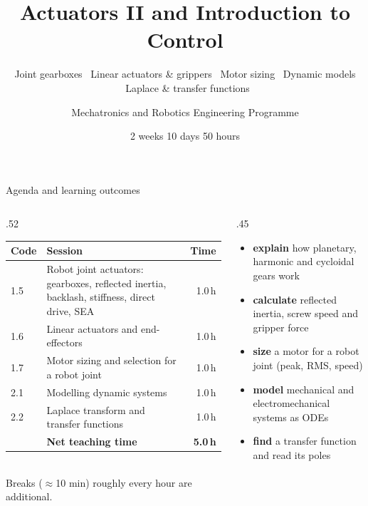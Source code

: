 \documentclass[aspectratio=169,10pt]{beamer}
\title[Actuators II and Introduction to Control]{Actuators II and Introduction to Control}
\subtitle{Joint gearboxes \textbullet\ Linear actuators \& grippers \textbullet\ Motor sizing \textbullet\ Dynamic models \textbullet\ Laplace \& transfer functions}
\author{Mechatronics and Robotics Engineering Programme}
\institute{Week 1 \textperiodcentered{} Day 2}
\date{2 weeks \textperiodcentered{} 10 days \textperiodcentered{} 50 hours}
\begin{document}
\begin{frame}[plain]\titlepage\end{frame}

\begin{frame}{Agenda and learning outcomes}
\begin{columns}[T]
\begin{column}{.52\textwidth}
\small
\renewcommand{\arraystretch}{1.12}
\begin{tabular}{@{}l p{5.0cm} r@{}}
\toprule
\textbf{Code} & \textbf{Session} & \textbf{Time}\\
\midrule
1.5 & Robot joint actuators: gearboxes, reflected inertia, backlash, stiffness, direct drive, SEA & 1.0\,h\\
1.6 & Linear actuators and end-effectors & 1.0\,h\\
1.7 & Motor sizing and selection for a robot joint & 1.0\,h\\
2.1 & Modelling dynamic systems & 1.0\,h\\
2.2 & Laplace transform and transfer functions & 1.0\,h\\
\midrule
 & \textbf{Net teaching time} & \textbf{5.0\,h}\\
\bottomrule
\end{tabular}\\[1mm]
{\scriptsize\color{mkGray} Breaks ($\approx$10 min) roughly every hour are additional.}
\end{column}
\begin{column}{.45\textwidth}
\begin{defbox}
\small
\begin{itemize}\setlength\itemsep{1pt}
\item \textbf{explain} how planetary, harmonic and cycloidal gears work
\item \textbf{calculate} reflected inertia, screw speed and gripper force
\item \textbf{size} a motor for a robot joint (peak, RMS, speed)
\item \textbf{model} mechanical and electromechanical systems as ODEs
\item \textbf{find} a transfer function and read its poles
\end{itemize}
\end{defbox}
\end{column}
\end{columns}
\end{frame}
\end{document}
